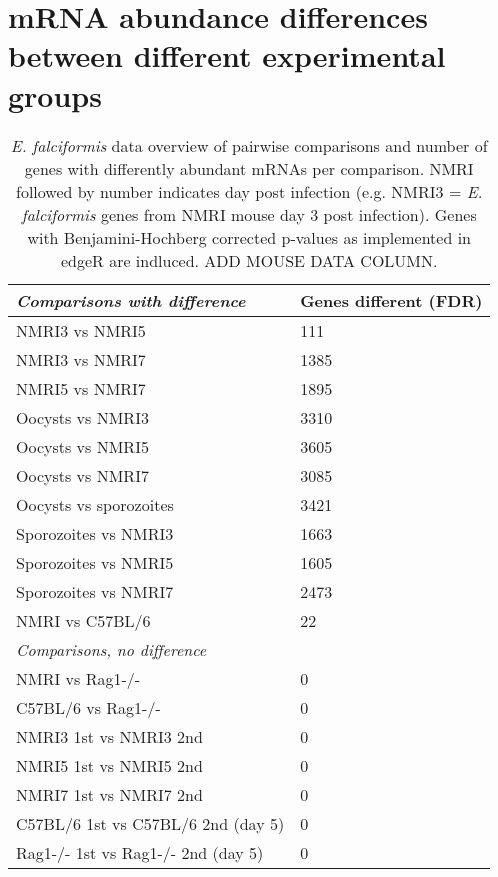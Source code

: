 \documentclass{article}
\begin{document}
\section{mRNA abundance differences between different experimental groups}
\setlength{\tabcolsep}{14pt}
\begin{table}[H]
\begin{center}
\caption{\textit{E. falciformis} data overview of pairwise comparisons and number of genes with differently abundant mRNAs 
	per comparison. NMRI followed by number indicates day post infection (e.g. NMRI3 = \textit{E. falciformis} genes from
	NMRI mouse day 3 post infection). Genes with Benjamini-Hochberg corrected p-values  as implemented in edgeR are indluced. 
	ADD MOUSE DATA COLUMN.}
\begin{tabular}{*2l}    \toprule
\textit{Comparisons with difference} & Genes different (FDR\leq0.01) \\ \midrule
	NMRI3 vs NMRI5     	& 111  \\
	NMRI3 vs NMRI7  	& 1385 \\ 
	NMRI5 vs NMRI7  	& 1895 \\
	Oocysts vs NMRI3  	& 3310 \\  
	Oocysts vs NMRI5	& 3605 \\ 
	Oocysts vs NMRI7	& 3085 \\ 
	Oocysts vs sporozoites & 3421 \\
	Sporozoites vs NMRI3 	& 1663 \\
	Sporozoites vs NMRI5 	& 1605 \\
	Sporozoites vs NMRI7 	& 2473 \\ 
	NMRI vs C57BL/6 	& 22 \\	\midrule	
\textit{Comparisons, no difference}  	\\ \midrule
	NMRI vs Rag1-/-     & 0 \\
	C57BL/6 vs Rag1-/-  & 0 \\
	NMRI3 1st vs NMRI3 2nd  	    & 0 \\
	NMRI5 1st vs NMRI5 2nd  	    & 0 \\
	NMRI7 1st vs NMRI7 2nd  	    & 0 \\
	C57BL/6 1st vs C57BL/6 2nd (day 5) & 0 \\
	Rag1-/- 1st vs Rag1-/- 2nd (day 5) & 0 \\ \bottomrule
\hline
\end{tabular}
\end{center}
\end{table}
\end{document}
